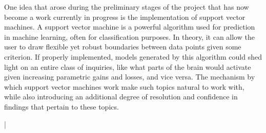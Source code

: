 \par One idea that arose during the preliminary stages of the project that has
now become a work currently in progress is the implementation of support vector
machines. A support vector machine is a powerful algorithm used for prediction
in machine learning, often for classification purposes. In theory, it can allow
the user to draw flexible yet robust boundaries between data points given some
criterion. If properly implemented, models generated by this algorithm could
shed light on an entire class of inquiries, like what parts of the brain would
activate given increasing parametric gains and losses, and vice versa. The
mechanism by which support vector machines work make such topics natural to work
with, while also introducing an additional degree of resolution and confidence
in findings that pertain to these topics.
\par {}|

